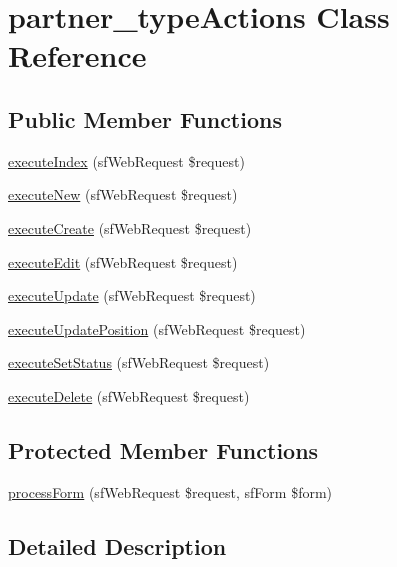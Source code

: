 \hypertarget{classpartner__type_actions}{\section{partner\-\_\-type\-Actions Class Reference}
\label{classpartner__type_actions}
}
\subsection*{Public Member Functions}
\begin{DoxyCompactItemize}
\item 
\hyperlink{classpartner__type_actions_a948cc911eb1d9f77990be54af3b2080f}{execute\-Index} (sf\-Web\-Request \$request)
\item 
\hyperlink{classpartner__type_actions_a0ffbea56560c6c633dae68ec22aff21c}{execute\-New} (sf\-Web\-Request \$request)
\item 
\hyperlink{classpartner__type_actions_a75837617743fb64dca82d8133b2c662a}{execute\-Create} (sf\-Web\-Request \$request)
\item 
\hyperlink{classpartner__type_actions_af4d8fedd4b28f3398826a1bb8fa54394}{execute\-Edit} (sf\-Web\-Request \$request)
\item 
\hyperlink{classpartner__type_actions_af7b4f51862add3c2ebb54efc136a0840}{execute\-Update} (sf\-Web\-Request \$request)
\item 
\hyperlink{classpartner__type_actions_acae2fa1cffde05d8c0331ca062d5ee54}{execute\-Update\-Position} (sf\-Web\-Request \$request)
\item 
\hyperlink{classpartner__type_actions_a365ffe9a4c547cdb81d9e2131e7bd7b9}{execute\-Set\-Status} (sf\-Web\-Request \$request)
\item 
\hyperlink{classpartner__type_actions_a52b5b11b11a0070dd2662257520c045a}{execute\-Delete} (sf\-Web\-Request \$request)
\end{DoxyCompactItemize}
\subsection*{Protected Member Functions}
\begin{DoxyCompactItemize}
\item 
\hyperlink{classpartner__type_actions_a7cf661d837626e0320753cbffa019a01}{process\-Form} (sf\-Web\-Request \$request, sf\-Form \$form)
\end{DoxyCompactItemize}


\subsection{Detailed Description}


